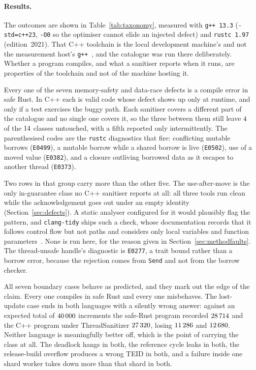 \documentclass[english,oneside,a4paper,censored,csm,software-track-2020]{HYthesisML}
\begin{document}
\paragraph{Results.}
The outcomes are shown in Table~\ref{tab:taxonomy}, measured with \texttt{g++~13.3}
(\texttt{-std=c++23}, \texttt{-O0} so the optimiser cannot elide an injected defect) and
\texttt{rustc~1.97} (edition~2021). That C++ toolchain is the local development machine's
and not the measurement host's \texttt{g++~\MainGpp}, and the catalogue was run there
deliberately. Whether a program compiles, and what a sanitiser reports when it runs, are
properties of the toolchain and not of the machine hosting it.

Every one of the seven memory-safety and data-race defects is a compile error in safe Rust.
In C++ each is valid code whose defect shows up only at runtime, and only if a test exercises
the buggy path. Each sanitiser covers a different part of the catalogue and no single one
covers it, so the three between them still leave $4$ of the
$14$ classes untouched, with a fifth reported only intermittently. The parenthesised
codes are the \texttt{rustc} diagnostics that fire: conflicting mutable borrows
(\texttt{E0499}), a mutable borrow while a shared borrow is live (\texttt{E0502}), use of a moved
value (\texttt{E0382}), and a closure outliving borrowed data as it escapes to another thread
(\texttt{E0373}).

Two rows in that group carry more than the other five. The use-after-move is the only
in-guarantee class no C++ sanitiser reports at all: all three tools run clean while the
acknowledgement goes out under an empty identity (Section~\ref{sec:defects}). A static analyser
configured for it would plausibly flag the pattern, and \texttt{clang-tidy} ships such a check,
whose documentation records that it follows control flow but not paths and considers only
local variables and function parameters~\cite{clangtidyuseaftermove}. None is run here, for the
reason given in Section~\ref{sec:methodfaults}. The thread-unsafe handle's diagnostic is
\texttt{E0277}, a trait bound rather than a borrow error, because the rejection comes from
\texttt{Send} and not from the borrow checker.

All seven boundary cases behave as predicted, and they mark out the edge of the claim. Every one
compiles in safe Rust and every one misbehaves. The lost-update case ends in both languages with
a silently wrong answer: against an expected total of $40\,000$ increments the
safe-Rust program recorded $28\,714$ and the C++ program under ThreadSanitizer
$27\,320$, losing $11\,286$ and $12\,680$. Neither language
is meaningfully better off, which is the point of carrying the class at all. The deadlock hangs
in both, the reference cycle leaks in both, the release-build overflow produces a wrong TEID in
both, and a failure inside one shard worker takes down more than that shard in both.
\end{document}
